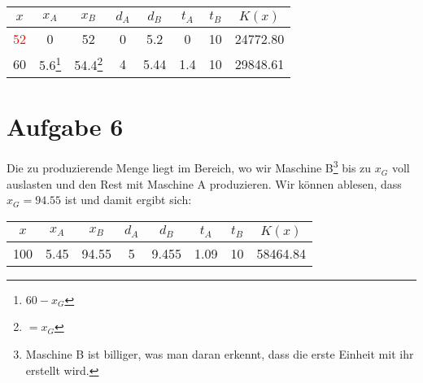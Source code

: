 \documentclass{article}
\begin{document}
\begin{enumerate}[label=(\alph*)]
\begin{center}
		\end{center}
		\begin{center}
			\begin{tabular}{c|ccccccc}
				$x$ & $x_A$ & $x_B$ & $d_A$ & $d_B$ & $t_A$ & $t_B$ & $K(x)$ \\
				\hline
				\textcolor{red}{52} & 0 & 52 & 0 & 5.2 & 0 & 10 & 24772.80 \\
				\textcolor{green!80!black}{60} & 5.6\footnote{$60-x_G$} & 54.4\footnote{$=x_G$} & 4 & 5.44 & 1.4 & 10 & 29848.61
			\end{tabular}
		\end{center}
	\end{enumerate}

	\section*{Aufgabe 6}
	Die zu produzierende Menge liegt im Bereich, wo wir Maschine B\footnote{Maschine B ist billiger, was man daran erkennt, dass die erste Einheit mit ihr erstellt wird.} bis zu $x_G$ voll auslasten und den Rest mit Maschine A produzieren. Wir können ablesen, dass $x_G=94.55$ ist und damit ergibt sich:
	\begin{center}
		\begin{tabular}{c|ccccccc}
			$x$ & $x_A$ & $x_B$ & $d_A$ & $d_B$ & $t_A$ & $t_B$ & $K(x)$ \\
			\hline
			100 & 5.45 & 94.55 & 5 & 9.455 & 1.09 & 10 & 58464.84
		\end{tabular}
	\end{center}
	
\end{document}
